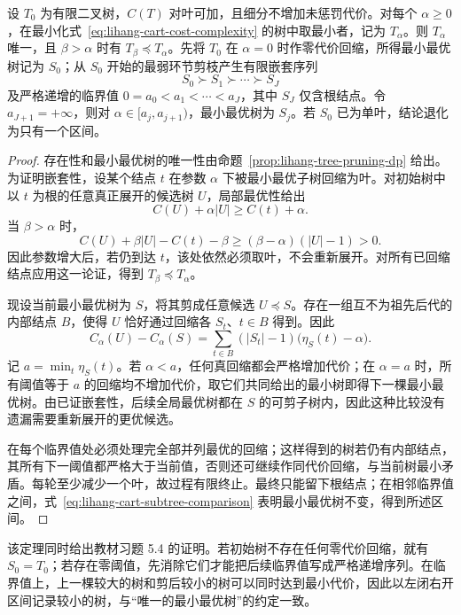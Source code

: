 \begin{theorem}[最小最优子树的嵌套性与剪枝路径]
\label{thm:lihang-cart-pruning-path}
设 $T_0$ 为有限二叉树，$C(T)$ 对叶可加，且细分不增加未惩罚代价。对每个 $\alpha\geq0$，在最小化式~\eqref{eq:lihang-cart-cost-complexity} 的树中取最小者，记为 $T_\alpha$。则 $T_\alpha$ 唯一，且 $\beta>\alpha$ 时有 $T_\beta\preceq T_\alpha$。先将 $T_0$ 在 $\alpha=0$ 时作零代价回缩，所得最小最优树记为 $S_0$；从 $S_0$ 开始的最弱环节剪枝产生有限嵌套序列
\[
  S_0\succ S_1\succ\cdots\succ S_J
\]
及严格递增的临界值 $0=a_0<a_1<\cdots<a_J$，其中 $S_J$ 仅含根结点。令 $a_{J+1}=+\infty$，则对 $\alpha\in[a_j,a_{j+1})$，最小最优树为 $S_j$。若 $S_0$ 已为单叶，结论退化为只有一个区间。
\end{theorem}
\begin{proof}
存在性和最小最优树的唯一性由命题~\ref{prop:lihang-tree-pruning-dp} 给出。为证明嵌套性，设某个结点 $t$ 在参数 $\alpha$ 下被最小最优子树回缩为叶。对初始树中以 $t$ 为根的任意真正展开的候选树 $U$，局部最优性给出
\[
  C(U)+\alpha|U|\geq C(t)+\alpha.
\]
当 $\beta>\alpha$ 时，
\[
  C(U)+\beta|U|-C(t)-\beta
  \geq(\beta-\alpha)(|U|-1)>0.
\]
因此参数增大后，若仍到达 $t$，该处依然必须取叶，不会重新展开。对所有已回缩结点应用这一论证，得到 $T_\beta\preceq T_\alpha$。

现设当前最小最优树为 $S$，将其剪成任意候选 $U\preceq S$。存在一组互不为祖先后代的内部结点 $B$，使得 $U$ 恰好通过回缩各 $S_t$、$t\in B$ 得到。因此
\begin{equation}
  C_\alpha(U)-C_\alpha(S)
  =\sum_{t\in B}(|S_t|-1)\bigl(\eta_S(t)-\alpha\bigr).
  \label{eq:lihang-cart-subtree-comparison}
\end{equation}
记 $a=\min_t\eta_S(t)$。若 $\alpha<a$，任何真回缩都会严格增加代价；在 $\alpha=a$ 时，所有阈值等于 $a$ 的回缩均不增加代价，取它们共同给出的最小树即得下一棵最小最优树。由已证嵌套性，后续全局最优树都在 $S$ 的可剪子树内，因此这种比较没有遗漏需要重新展开的更优候选。

在每个临界值处必须处理完全部并列最优的回缩；这样得到的树若仍有内部结点，其所有下一阈值都严格大于当前值，否则还可继续作同代价回缩，与当前树最小矛盾。每轮至少减少一个叶，故过程有限终止。最终只能留下根结点；在相邻临界值之间，式~\eqref{eq:lihang-cart-subtree-comparison} 表明最小最优树不变，得到所述区间。\qedhere
\end{proof}

该定理同时给出教材习题 5.4 的证明。若初始树不存在任何零代价回缩，就有 $S_0=T_0$；若存在零阈值，先消除它们才能把后续临界值写成严格递增序列。在临界值上，上一棵较大的树和剪后较小的树可以同时达到最小代价，因此以左闭右开区间记录较小的树，与“唯一的最小最优树”的约定一致。

